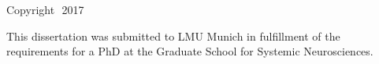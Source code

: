 
\thispagestyle{empty}

\hfill


\begin{flushright}
\myName \\
\smallskip
\textit{\myTitle}\\
\smallskip
Copyright\,\textcopyright\ 2017
\end{flushright}

\medskip

\noindent
This dissertation was submitted to LMU Munich in fulfillment of the requirements for a PhD at the Graduate School for Systemic Neurosciences.

\bigskip

\noindent
\textsf{}

\noindent
{}\,\mail{\myEmail}
